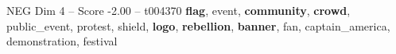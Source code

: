 \begin{textsample}{NEG Dim 4 – Score -2.00 – t004370}  \label{ex:f4_neg_026}
\textbf{flag}, event, \textbf{community}, \textbf{crowd}, public\_event, protest, shield, \textbf{logo}, \textbf{rebellion}, \textbf{banner}, fan, captain\_america, demonstration, festival

\end{textsample}
